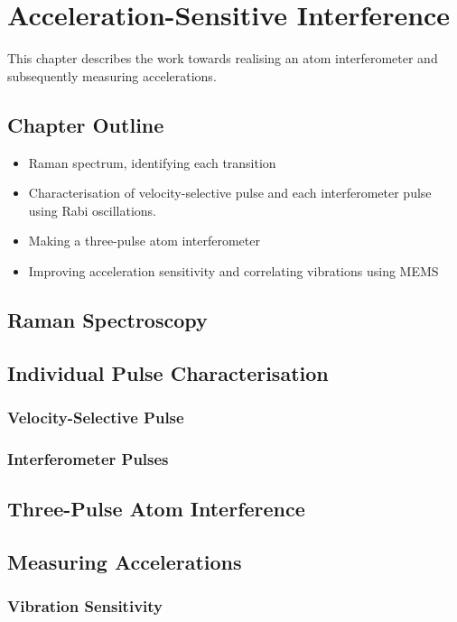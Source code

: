 \chapter{Acceleration-Sensitive Interference}\label{chap:atom_int}
This chapter describes the work towards realising an atom interferometer and subsequently measuring accelerations.
\section{Chapter Outline}
\begin{itemize}
    \item Raman spectrum, identifying each transition
    \item Characterisation of velocity-selective pulse and each interferometer pulse using Rabi oscillations.
    \item Making a three-pulse atom interferometer
    \item Improving acceleration sensitivity and correlating vibrations using MEMS
\end{itemize}
\section{Raman Spectroscopy}\label{sec:atomint_ramanspec}
\section{Individual Pulse Characterisation} \label{sec:atomint_rabiosc}
\subsection{Velocity-Selective Pulse}
\subsection{Interferometer Pulses}
\section{Three-Pulse Atom Interference} \label{sec:atomint_threepulse}
\section{Measuring Accelerations}\label{sec:atomint_accelerations}
\subsection{Vibration Sensitivity}